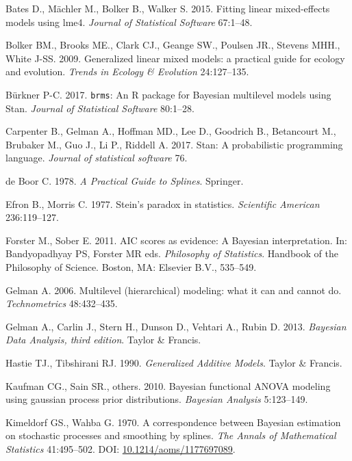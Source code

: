 \documentclass[12pt]{article}
\begin{document}
\hypertarget{ref-bates_fitting_2015}{}
Bates D., Mächler M., Bolker B., Walker S. 2015. Fitting linear
mixed-effects models using lme4. \emph{Journal of Statistical Software}
67:1--48.

\hypertarget{ref-Bolker:2009cs}{}
Bolker BM., Brooks ME., Clark CJ., Geange SW., Poulsen JR., Stevens
MHH., White J-SS. 2009. Generalized linear mixed models: a practical
guide for ecology and evolution. \emph{Trends in Ecology \& Evolution}
24:127--135.

\hypertarget{ref-burkner_brms:_2017}{}
Bürkner P-C. 2017. \texttt{brms}: An R package for Bayesian multilevel
models using Stan. \emph{Journal of Statistical Software} 80:1--28.

\hypertarget{ref-carpenter_stan:_2017}{}
Carpenter B., Gelman A., Hoffman MD., Lee D., Goodrich B., Betancourt
M., Brubaker M., Guo J., Li P., Riddell A. 2017. Stan: A probabilistic
programming language. \emph{Journal of statistical software} 76.

\hypertarget{ref-deBoor:1978wq}{}
de Boor C. 1978. \emph{A Practical Guide to Splines}. Springer.

\hypertarget{ref-efron_steins_1977}{}
Efron B., Morris C. 1977. Stein's paradox in statistics.
\emph{Scientific American} 236:119--127.

\hypertarget{ref-forster_aic_2011}{}
Forster M., Sober E. 2011. AIC scores as evidence: A Bayesian
interpretation. In: Bandyopadhyay PS, Forster MR eds. \emph{Philosophy
of Statistics}. Handbook of the Philosophy of Science. Boston, MA:
Elsevier B.V., 535--549.

\hypertarget{ref-Gelman:2006jh}{}
Gelman A. 2006. Multilevel (hierarchical) modeling: what it can and
cannot do. \emph{Technometrics} 48:432--435.

\hypertarget{ref-gelman2013bayesian}{}
Gelman A., Carlin J., Stern H., Dunson D., Vehtari A., Rubin D. 2013.
\emph{Bayesian Data Analysis, third edition}. Taylor \& Francis.

\hypertarget{ref-Hastie:1990vg}{}
Hastie TJ., Tibshirani RJ. 1990. \emph{Generalized Additive Models}.
Taylor \& Francis.

\hypertarget{ref-kaufman_bayesian_2010}{}
Kaufman CG., Sain SR., others. 2010. Bayesian functional ANOVA modeling
using gaussian process prior distributions. \emph{Bayesian Analysis}
5:123--149.

\hypertarget{ref-kimeldorf_correspondence_1970}{}
Kimeldorf GS., Wahba G. 1970. A correspondence between Bayesian
estimation on stochastic processes and smoothing by splines. \emph{The
Annals of Mathematical Statistics} 41:495--502. DOI:
\href{https://doi.org/10.1214/aoms/1177697089}{10.1214/aoms/1177697089}.
\end{document}
